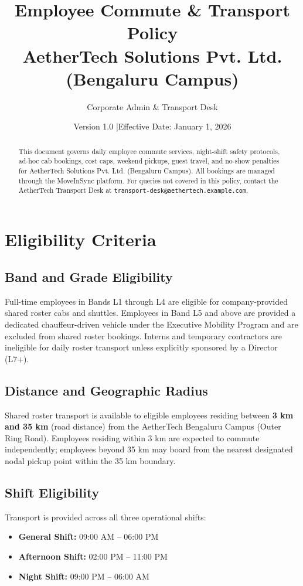 \documentclass[11pt,a4paper]{article}
\title{\textbf{Employee Commute \& Transport Policy}\\[0.4em]
\large AetherTech Solutions Pvt. Ltd. (Bengaluru Campus)}
\author{Corporate Admin \& Transport Desk}
\date{Version 1.0 \quad|\quad Effective Date: January 1, 2026}
\begin{document}
\maketitle
\thispagestyle{fancy}

\begin{abstract}
This document governs daily employee commute services, night-shift safety protocols, ad-hoc cab bookings, cost caps, weekend pickups, guest travel, and no-show penalties for AetherTech Solutions Pvt. Ltd. (Bengaluru Campus). All bookings are managed through the MoveInSync platform. For queries not covered in this policy, contact the AetherTech Transport Desk at \texttt{transport-desk@aethertech.example.com}.
\end{abstract}

\section{Eligibility Criteria}
\subsection{Band and Grade Eligibility}
Full-time employees in Bands L1 through L4 are eligible for company-provided shared roster cabs and shuttles. Employees in Band L5 and above are provided a dedicated chauffeur-driven vehicle under the Executive Mobility Program and are excluded from shared roster bookings. Interns and temporary contractors are ineligible for daily roster transport unless explicitly sponsored by a Director (L7+).

\subsection{Distance and Geographic Radius}
Shared roster transport is available to eligible employees residing between \textbf{3 km and 35 km} (road distance) from the AetherTech Bengaluru Campus (Outer Ring Road). Employees residing within 3 km are expected to commute independently; employees beyond 35 km may board from the nearest designated nodal pickup point within the 35 km boundary.

\subsection{Shift Eligibility}
Transport is provided across all three operational shifts:
\begin{itemize}[noitemsep]
    \item \textbf{General Shift:} 09:00 AM -- 06:00 PM
    \item \textbf{Afternoon Shift:} 02:00 PM -- 11:00 PM
    \item \textbf{Night Shift:} 09:00 PM -- 06:00 AM
\end{itemize}
\end{document}
